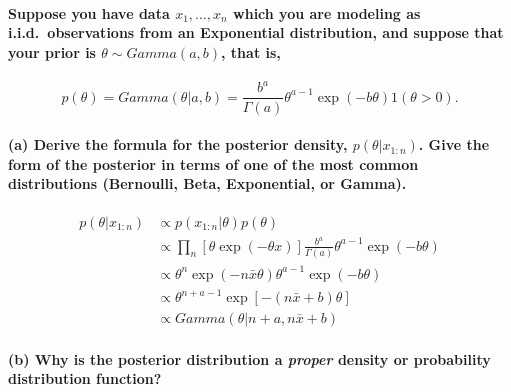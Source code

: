 \documentclass[]{article}
\let\oldparagraph\paragraph
\renewcommand{\paragraph}[1]{\oldparagraph{#1}\mbox{}}
\begin{document}
\paragraph{\texorpdfstring{Suppose you have data \(x_1,\dotsc,x_n\)
which you are modeling as i.i.d.~observations from an Exponential
distribution, and suppose that your prior is \(\theta\sim Gamma(a,b)\),
that
is,}{Suppose you have data x\_1,\textbackslash{}dotsc,x\_n which you are modeling as i.i.d.~observations from an Exponential distribution, and suppose that your prior is \textbackslash{}theta\textbackslash{}sim Gamma(a,b), that is,}}\label{suppose-you-have-data-x_1dotscx_n-which-you-are-modeling-as-i.i.d.observations-from-an-exponential-distribution-and-suppose-that-your-prior-is-thetasim-gammaab-that-is}

\[ p(\theta) = Gamma(\theta|a,b) = \frac{b^a}{\Gamma(a)}\theta^{a-1}\exp(-b\theta)1(\theta>0). \]

\paragraph{\texorpdfstring{(a) Derive the formula for the posterior
density, \(p(\theta|x_{1:n})\). Give the form of the posterior in terms
of one of the most common distributions (Bernoulli, Beta, Exponential,
or
Gamma).}{(a) Derive the formula for the posterior density, p(\textbackslash{}theta\textbar{}x\_\{1:n\}). Give the form of the posterior in terms of one of the most common distributions (Bernoulli, Beta, Exponential, or Gamma).}}\label{a-derive-the-formula-for-the-posterior-density-pthetax_1n.-give-the-form-of-the-posterior-in-terms-of-one-of-the-most-common-distributions-bernoulli-beta-exponential-or-gamma.}

\[\begin{align}p(\theta|x_{1:n}) & \propto p(x_{1:n}|\theta)p(\theta)\\
& \propto \prod_n[\theta\exp(-\theta x)]\frac{b^a}{\Gamma(a)}\theta^{a-1}\exp(-b\theta)\\
& \propto \theta^n\exp(-n\bar{x}\theta)\theta^{a-1}\exp(-b\theta)\\
& \propto \theta^{n+a-1}\exp[-(n\bar{x}+b)\theta]\\
& \propto Gamma(\theta|n+a,n\bar{x}+b)
\end{align}\]

\paragraph{\texorpdfstring{(b) Why is the posterior distribution a
\textbf{\emph{proper}} density or probability distribution
function?}{(b) Why is the posterior distribution a proper density or probability distribution function?}}\label{b-why-is-the-posterior-distribution-a-proper-density-or-probability-distribution-function}
\end{document}
